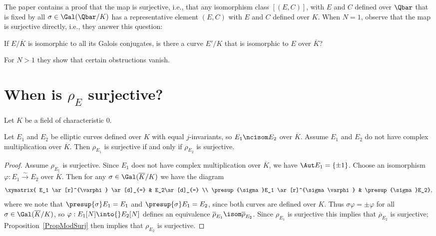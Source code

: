 \documentclass{report}
\begin{document}
The paper \cite{deligne-rapoport} contains a proof that the map is
surjective, i.e., that any isomorphism class $[(E,C)]$, with $E$ and
$C$ defined over $\Qbar$ that is fixed by all $\sigma\in
\Gal(\Qbar/K)$ has a representative element $(E,C)$ with $E$ and $C$
defined over $K$.  When $N=1$, \cite{deligne-rapoport} observe that the
map is surjective directly, i.e., they answer this question:
\begin{question}
If $E/\overline{K}$ is isomorphic to all its Galois conjugates, is there
a curve $E'/K$ that is isomorphic to $E$ over $\overline{K}$?
\end{question}
For $N>1$ they show that certain obstructions vanish. 

\section{When is $\rho_E$ surjective?}\label{sec:rhoEC}
Let $K$ be a field of characteristic $0$.

\begin{proposition}\label{prop:surjiso}
  Let $E_1$ and $E_2$ be elliptic curves defined over $K$ with equal
  $j$-invariants, so $E_1\ncisom E_2$ over $\overline{K}$.  Assume
  $E_1$ and $E_2$ do not have complex multiplication over
  $\overline{K}$.  Then $\rho_{E_1}$ is surjective if and only if
  $\rho_{E_2}$ is surjective.
\end{proposition}
\begin{proof}
Assume $\rho_{E_1}$ is surjective. Since $E_1$ does not have
 complex multiplication
over $\overline{K}$, we have $\Aut E_1=\{\pm 1\}$. Choose an isomorphism
$\varphi:E_1\xrightarrow{\sim}E_2$ over $\overline{K}$.
Then for any $\sigma\in\Gal(\overline{K}/K)$ we have the diagram
$$\xymatrix{
     E_1 \ar[r]^{\varphi} \ar[d]_{=} & E_2\ar[d]_{=} \\
   \presup{\sigma}E_1 \ar[r]^{\sigma\varphi} & \presup{\sigma}E_2},$$
where we note that $\presup{\sigma}E_1 = E_1$ and
$\presup{\sigma}E_1 = E_2$, since both curves are defined over $K$.
Thus $\sigma\varphi=\pm\varphi$ for all $\sigma\in\Gal(\overline{K}/K)$,
so $\varphi:E_1[N]\into{}E_2[N]$ defines an equivalence
$\overline{\rho}_{E_1}\isom\overline{\rho}_{E_2}$.
Since $\rho_{E_1}$ is surjective this implies that $\overline{\rho}_{E_2}$
is surjective; Proposition~\ref{PropModSurj} then implies that $\rho_{E_2}$
is surjective.
\end{proof}
\end{document}
